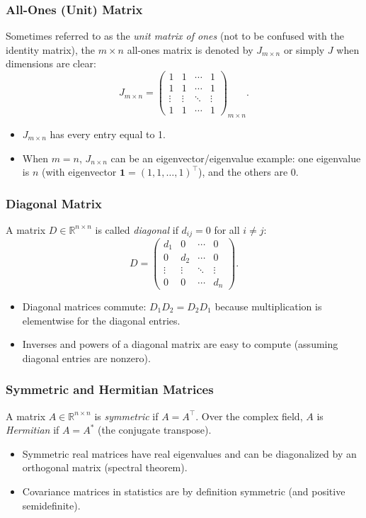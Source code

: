 \begin{itemize}
\subsubsection{All-Ones (Unit) Matrix}
Sometimes referred to as the \emph{unit matrix of ones} (not to be confused with the identity matrix), 
the $m \times n$ all-ones matrix is denoted by $J_{m \times n}$ or simply $J$ when dimensions are clear:
\[
J_{m \times n} = 
\begin{pmatrix}
1 & 1 & \cdots & 1 \\
1 & 1 & \cdots & 1 \\
\vdots & \vdots & \ddots & \vdots \\
1 & 1 & \cdots & 1
\end{pmatrix}_{m \times n}.
\]
\begin{itemize}
    \item $J_{m \times n}$ has every entry equal to 1.
    \item When $m = n$, $J_{n \times n}$ can be an eigenvector/eigenvalue example: 
          one eigenvalue is $n$ (with eigenvector $\mathbf{1} = (1,1,\dots,1)^\top$), 
          and the others are 0.
\end{itemize}

\subsubsection{Diagonal Matrix}
A matrix $D \in \mathbb{R}^{n \times n}$ is called \emph{diagonal} if $d_{ij} = 0$ for all $i \neq j$:
\[
D = 
\begin{pmatrix}
d_{1} & 0 & \cdots & 0 \\
0 & d_{2} & \cdots & 0 \\
\vdots & \vdots & \ddots & \vdots \\
0 & 0 & \cdots & d_{n}
\end{pmatrix}.
\]
\begin{itemize}
    \item Diagonal matrices commute: $D_1 D_2 = D_2 D_1$ because multiplication is elementwise for the diagonal entries.
    \item Inverses and powers of a diagonal matrix are easy to compute (assuming diagonal entries are nonzero).
\end{itemize}

\subsubsection{Symmetric and Hermitian Matrices}
A matrix $A \in \mathbb{R}^{n \times n}$ is \emph{symmetric} if $A = A^\top$. 
Over the complex field, $A$ is \emph{Hermitian} if $A = A^*$ (the conjugate transpose).
\begin{itemize}
    \item Symmetric real matrices have real eigenvalues and can be diagonalized by an orthogonal matrix (spectral theorem).
    \item Covariance matrices in statistics are by definition symmetric (and positive semidefinite).
\end{itemize}


\end{itemize}
